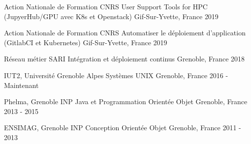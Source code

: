 

\begin{cventries}

  \cventrynodescr
    {Action Nationale de Formation CNRS} %
    {User Support Tools for HPC (JupyerHub/GPU avec K8s et Openstack)} %
    {Gif-Sur-Yvette, France} %
    {2019} %

  \cventrynodescr
    {Action Nationale de Formation CNRS} %
    {Automatiser le déploiement d'application (GitlabCI et Kubernetes)} %
    {Gif-Sur-Yvette, France} %
    {2019} %

  \cventrynodescr
    {Réseau métier SARI} %
    {Intégration et déploiement continus} %
    {Grenoble, France} %
    {2018} %

  \cventrynodescr
    {IUT2, Université Grenoble Alpes} %
    {Systèmes UNIX} %
    {Grenoble, France} %
    {2016 - Maintenant} %

  \cventrynodescr
    {Phelma, Grenoble INP} %
    {Java et Programmation Orientée Objet} %
    {Grenoble, France} %
    {2013 - 2015} %

  \cventrynodescr
    {ENSIMAG, Grenoble INP} %
    {Conception Orientée Objet} %
    {Grenoble, France} %
    {2011 - 2013} %
    
\end{cventries}
